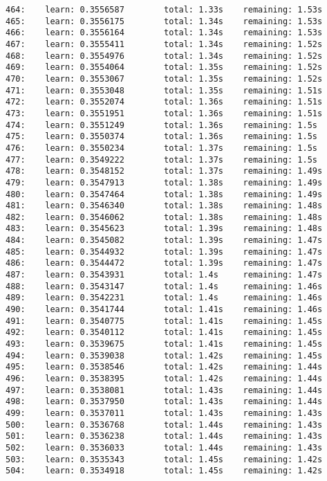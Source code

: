 \documentclass[11pt]{article}
\begin{document}
\begin{Verbatim}[commandchars=\\\{\}]
464:    learn: 0.3556587        total: 1.33s    remaining: 1.53s
465:    learn: 0.3556175        total: 1.34s    remaining: 1.53s
466:    learn: 0.3556164        total: 1.34s    remaining: 1.53s
467:    learn: 0.3555411        total: 1.34s    remaining: 1.52s
468:    learn: 0.3554976        total: 1.34s    remaining: 1.52s
469:    learn: 0.3554064        total: 1.35s    remaining: 1.52s
470:    learn: 0.3553067        total: 1.35s    remaining: 1.52s
471:    learn: 0.3553048        total: 1.35s    remaining: 1.51s
472:    learn: 0.3552074        total: 1.36s    remaining: 1.51s
473:    learn: 0.3551951        total: 1.36s    remaining: 1.51s
474:    learn: 0.3551249        total: 1.36s    remaining: 1.5s
475:    learn: 0.3550374        total: 1.36s    remaining: 1.5s
476:    learn: 0.3550234        total: 1.37s    remaining: 1.5s
477:    learn: 0.3549222        total: 1.37s    remaining: 1.5s
478:    learn: 0.3548152        total: 1.37s    remaining: 1.49s
479:    learn: 0.3547913        total: 1.38s    remaining: 1.49s
480:    learn: 0.3547464        total: 1.38s    remaining: 1.49s
481:    learn: 0.3546340        total: 1.38s    remaining: 1.48s
482:    learn: 0.3546062        total: 1.38s    remaining: 1.48s
483:    learn: 0.3545623        total: 1.39s    remaining: 1.48s
484:    learn: 0.3545082        total: 1.39s    remaining: 1.47s
485:    learn: 0.3544932        total: 1.39s    remaining: 1.47s
486:    learn: 0.3544472        total: 1.39s    remaining: 1.47s
487:    learn: 0.3543931        total: 1.4s     remaining: 1.47s
488:    learn: 0.3543147        total: 1.4s     remaining: 1.46s
489:    learn: 0.3542231        total: 1.4s     remaining: 1.46s
490:    learn: 0.3541744        total: 1.41s    remaining: 1.46s
491:    learn: 0.3540775        total: 1.41s    remaining: 1.45s
492:    learn: 0.3540112        total: 1.41s    remaining: 1.45s
493:    learn: 0.3539675        total: 1.41s    remaining: 1.45s
494:    learn: 0.3539038        total: 1.42s    remaining: 1.45s
495:    learn: 0.3538546        total: 1.42s    remaining: 1.44s
496:    learn: 0.3538395        total: 1.42s    remaining: 1.44s
497:    learn: 0.3538081        total: 1.43s    remaining: 1.44s
498:    learn: 0.3537950        total: 1.43s    remaining: 1.44s
499:    learn: 0.3537011        total: 1.43s    remaining: 1.43s
500:    learn: 0.3536768        total: 1.44s    remaining: 1.43s
501:    learn: 0.3536238        total: 1.44s    remaining: 1.43s
502:    learn: 0.3536033        total: 1.44s    remaining: 1.43s
503:    learn: 0.3535343        total: 1.45s    remaining: 1.42s
504:    learn: 0.3534918        total: 1.45s    remaining: 1.42s

\end{Verbatim}
\end{document}
